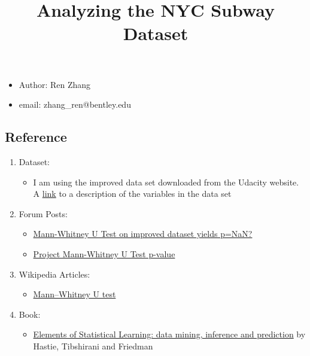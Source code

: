 \documentclass{article}
\title{Analyzing the NYC Subway Dataset}
\begin{document}
    
    
    \maketitle
    
    

    
    \begin{itemize}
\itemsep1pt\parskip0pt
\item
  Author: Ren Zhang\\
\item
  email: zhang\_ren@bentley.edu
\end{itemize}

    \subsection{Reference}\label{reference}

\begin{enumerate}
\def\labelenumi{\arabic{enumi}.}
\itemsep1pt\parskip0pt
\item
  Dataset:

  \begin{itemize}
  \itemsep1pt\parskip0pt
  \item
    I am using the improved data set downloaded from the Udacity
    website. A
    \href{https://s3.amazonaws.com/uploads.hipchat.com/23756/665149/05bgLZqSsMycnkg/turnstile-weather-variables.pdf}{link}
    to a description of the variables in the data set
  \end{itemize}
\item
  Forum Posts:

  \begin{itemize}
  \itemsep1pt\parskip0pt
  \item
    \href{https://discussions.udacity.com/t/mann-whitney-u-test-on-improved-dataset-yields-p-nan/4470}{Mann-Whitney
    U Test on improved dataset yields p=NaN?}
  \item
    \href{https://discussions.udacity.com/t/project-mann-whitney-u-test-p-value/18145/6}{Project
    Mann-Whitney U Test p-value}
  \end{itemize}
\item
  Wikipedia Articles:

  \begin{itemize}
  \itemsep1pt\parskip0pt
  \item
    \href{https://en.wikipedia.org/wiki/Mann\%E2\%80\%93Whitney_U_test}{Mann--Whitney
    U test}
  \end{itemize}
\item
  Book:

  \begin{itemize}
  \itemsep1pt\parskip0pt
  \item
    \href{http://www-stat.stanford.edu/~tibs/ElemStatLearn/index.html}{Elements
    of Statistical Learning: data mining, inference and prediction} by
    Hastie, Tibshirani and Friedman
  \end{itemize}
\end{enumerate}
\end{document}
